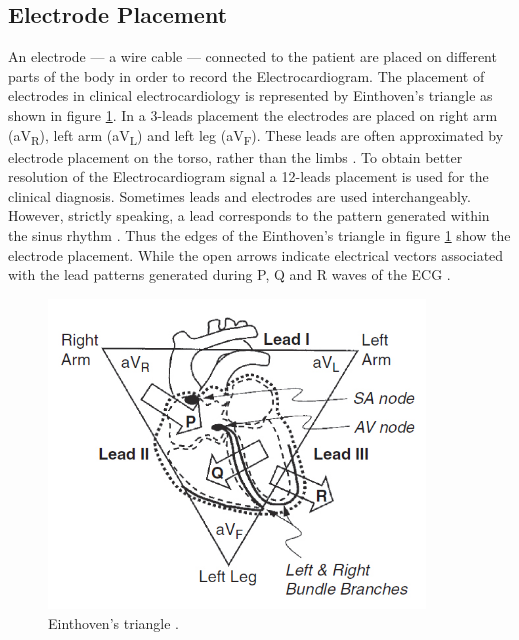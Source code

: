 \subsection{Electrode Placement} 
\label{sec:einthoven} An electrode --- a wire cable --- connected to the patient are placed on different parts of the body in order to record the Electrocardiogram. The placement of electrodes in clinical electrocardiology is represented by Einthoven's triangle as shown in figure \ref{fig:einthoven_triangle}. In a 3-leads placement the electrodes are placed on right arm (aV\textsubscript{R}), left arm (aV\textsubscript{L}) and left leg (aV\textsubscript{F}). These leads are often approximated by electrode placement on the torso, rather than the limbs \cite{cacioppo_cardiovascular_2016_p_183_216}. To obtain better resolution of the Electrocardiogram signal a 12-leads placement is used for the clinical diagnosis. Sometimes leads and electrodes are used interchangeably. However, strictly speaking, a lead corresponds to the pattern generated within the sinus rhythm \cite{hampton_ecg_2013}. Thus the edges of the Einthoven's triangle in figure \ref{fig:einthoven_triangle} show the electrode placement. While the open arrows indicate electrical vectors associated with the lead patterns generated during P, Q and R waves of the ECG \cite{cacioppo_cardiovascular_2016_p_183_216}.

\begin{figure}
    \centering
    \includegraphics[width=100mm]{Figures/einthoven_triangle.jpg}
    \caption{Einthoven's triangle \cite{cacioppo_cardiovascular_2016_p_183_216}.}
    \label{fig:einthoven_triangle}
\end{figure}

